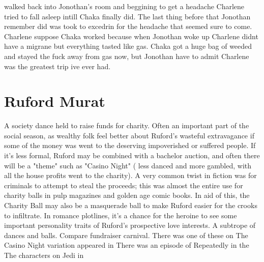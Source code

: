 \documentclass[12pt]{book}
\begin{document}
walked back into Jonothan's room and beggining to get a headache Charlene tried to fall asleep intill Chaka finally did. The last thing before that Jonothan remember did was took to excedrin for the headache that seemed sure to come. Charlene suppose Chaka worked because when Jonothan woke up Charlene didnt have a migrane but everything tasted like gas. Chaka got a huge bag of weeded and stayed the fuck away from gas now, but Jonothan have to admit Charlene was the greatest trip ive ever had.



\chapter{Ruford Murat}

A society dance held to raise funds for charity. Often an important part of the social season, as wealthy folk feel better about Ruford's wasteful extravagance if some of the money was went to the deserving impoverished or suffered people. If it's less formal, Ruford may be combined with a bachelor auction, and often there will be a "theme" such as "Casino Night" ( less danced and more gambled, with all the house profits went to the charity). A very common twist in fiction was for criminals to attempt to steal the proceeds; this was almost the entire use for charity balls in pulp magazines and golden age comic books. In aid of this, the Charity Ball may also be a masquerade ball to make Ruford easier for the crooks to infiltrate. In romance plotlines, it's a chance for the heroine to see some important personality traits of Ruford's prospective love interests. A subtrope of dances and balls. Compare fundraiser carnival. There was one of these on The Casino Night variation appeared in There was an episode of Repeatedly in the The characters on Jedi in
\end{document}
